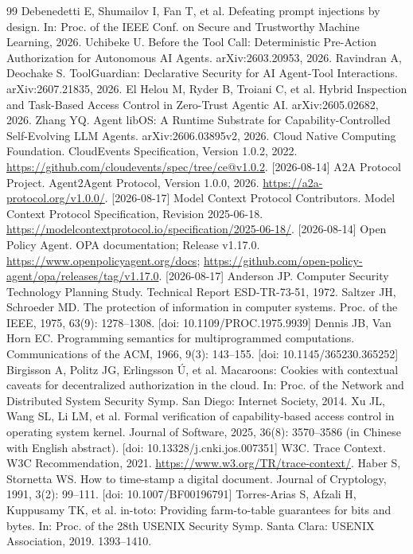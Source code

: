 {\begin{thebibliography}{99}
 Debenedetti E, Shumailov I, Fan T, et al. Defeating prompt injections by design. In: Proc. of the IEEE Conf. on Secure and Trustworthy Machine Learning, 2026.
 Uchibeke U. Before the Tool Call: Deterministic Pre-Action Authorization for Autonomous AI Agents. arXiv:2603.20953, 2026.
 Ravindran A, Deochake S. ToolGuardian: Declarative Security for AI Agent-Tool Interactions. arXiv:2607.21835, 2026.
 El Helou M, Ryder B, Troiani C, et al. Hybrid Inspection and Task-Based Access Control in Zero-Trust Agentic AI. arXiv:2605.02682, 2026.
 Zhang YQ. Agent libOS: A Runtime Substrate for Capability-Controlled Self-Evolving LLM Agents. arXiv:2606.03895v2, 2026.
 Cloud Native Computing Foundation. CloudEvents Specification, Version 1.0.2, 2022. \url{https://github.com/cloudevents/spec/tree/ce@v1.0.2}. [2026-08-14]
 A2A Protocol Project. Agent2Agent Protocol, Version 1.0.0, 2026. \url{https://a2a-protocol.org/v1.0.0/}. [2026-08-17]
 Model Context Protocol Contributors. Model Context Protocol Specification, Revision 2025-06-18. \url{https://modelcontextprotocol.io/specification/2025-06-18/}. [2026-08-14]
 Open Policy Agent. OPA documentation; Release v1.17.0. \url{https://www.openpolicyagent.org/docs}; \url{https://github.com/open-policy-agent/opa/releases/tag/v1.17.0}. [2026-08-17]
 Anderson JP. Computer Security Technology Planning Study. Technical Report ESD-TR-73-51, 1972.
 Saltzer JH, Schroeder MD. The protection of information in computer systems. Proc. of the IEEE, 1975, 63(9): 1278--1308. [doi: 10.1109/PROC.1975.9939]
 Dennis JB, Van Horn EC. Programming semantics for multiprogrammed computations. Communications of the ACM, 1966, 9(3): 143--155. [doi: 10.1145/365230.365252]
 Birgisson A, Politz JG, Erlingsson \'{U}, et al. Macaroons: Cookies with contextual caveats for decentralized authorization in the cloud. In: Proc. of the Network and Distributed System Security Symp. San Diego: Internet Society, 2014.
 Xu JL, Wang SL, Li LM, et al. Formal verification of capability-based access control in operating system kernel. Journal of Software, 2025, 36(8): 3570--3586 (in Chinese with English abstract). [doi: 10.13328/j.cnki.jos.007351]
 W3C. Trace Context. W3C Recommendation, 2021. \url{https://www.w3.org/TR/trace-context/}.
 Haber S, Stornetta WS. How to time-stamp a digital document. Journal of Cryptology, 1991, 3(2): 99--111. [doi: 10.1007/BF00196791]
 Torres-Arias S, Afzali H, Kuppusamy TK, et al. in-toto: Providing farm-to-table guarantees for bits and bytes. In: Proc. of the 28th USENIX Security Symp. Santa Clara: USENIX Association, 2019. 1393--1410.
\end{thebibliography}
}
